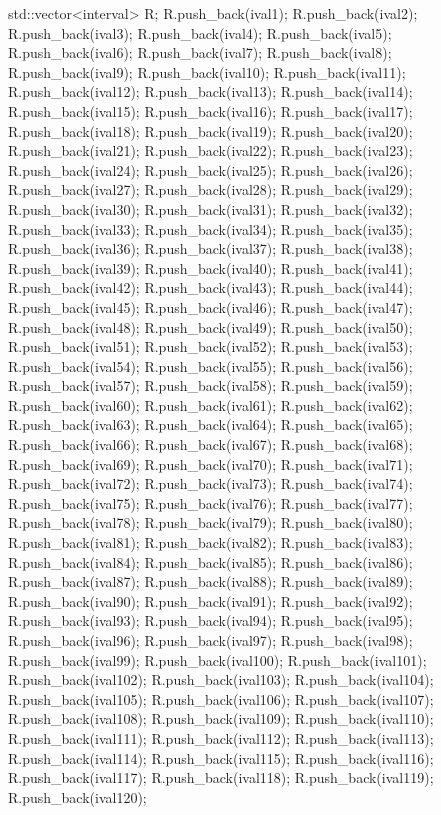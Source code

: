 \begin{DoxyCode}
{
   std::vector<interval> R;
R.push_back(ival1);
R.push_back(ival2);
R.push_back(ival3);
R.push_back(ival4);
R.push_back(ival5);
R.push_back(ival6);
R.push_back(ival7);
R.push_back(ival8);
R.push_back(ival9);
R.push_back(ival10);
R.push_back(ival11);
R.push_back(ival12);
R.push_back(ival13);
R.push_back(ival14);
R.push_back(ival15);
R.push_back(ival16);
R.push_back(ival17);
R.push_back(ival18);
R.push_back(ival19);
R.push_back(ival20);
R.push_back(ival21);
R.push_back(ival22);
R.push_back(ival23);
R.push_back(ival24);
R.push_back(ival25);
R.push_back(ival26);
R.push_back(ival27);
R.push_back(ival28);
R.push_back(ival29);
R.push_back(ival30);
R.push_back(ival31);
R.push_back(ival32);
R.push_back(ival33);
R.push_back(ival34);
R.push_back(ival35);
R.push_back(ival36);
R.push_back(ival37);
R.push_back(ival38);
R.push_back(ival39);
R.push_back(ival40);
R.push_back(ival41);
R.push_back(ival42);
R.push_back(ival43);
R.push_back(ival44);
R.push_back(ival45);
R.push_back(ival46);
R.push_back(ival47);
R.push_back(ival48);
R.push_back(ival49);
R.push_back(ival50);
R.push_back(ival51);
R.push_back(ival52);
R.push_back(ival53);
R.push_back(ival54);
R.push_back(ival55);
R.push_back(ival56);
R.push_back(ival57);
R.push_back(ival58);
R.push_back(ival59);
R.push_back(ival60);
R.push_back(ival61);
R.push_back(ival62);
R.push_back(ival63);
R.push_back(ival64);
R.push_back(ival65);
R.push_back(ival66);
R.push_back(ival67);
R.push_back(ival68);
R.push_back(ival69);
R.push_back(ival70);
R.push_back(ival71);
R.push_back(ival72);
R.push_back(ival73);
R.push_back(ival74);
R.push_back(ival75);
R.push_back(ival76);
R.push_back(ival77);
R.push_back(ival78);
R.push_back(ival79);
R.push_back(ival80);
R.push_back(ival81);
R.push_back(ival82);
R.push_back(ival83);
R.push_back(ival84);
R.push_back(ival85);
R.push_back(ival86);
R.push_back(ival87);
R.push_back(ival88);
R.push_back(ival89);
R.push_back(ival90);
R.push_back(ival91);
R.push_back(ival92);
R.push_back(ival93);
R.push_back(ival94);
R.push_back(ival95);
R.push_back(ival96);
R.push_back(ival97);
R.push_back(ival98);
R.push_back(ival99);
R.push_back(ival100);
R.push_back(ival101);
R.push_back(ival102);
R.push_back(ival103);
R.push_back(ival104);
R.push_back(ival105);
R.push_back(ival106);
R.push_back(ival107);
R.push_back(ival108);
R.push_back(ival109);
R.push_back(ival110);
R.push_back(ival111);
R.push_back(ival112);
R.push_back(ival113);
R.push_back(ival114);
R.push_back(ival115);
R.push_back(ival116);
R.push_back(ival117);
R.push_back(ival118);
R.push_back(ival119);
R.push_back(ival120);
}
\end{DoxyCode}
